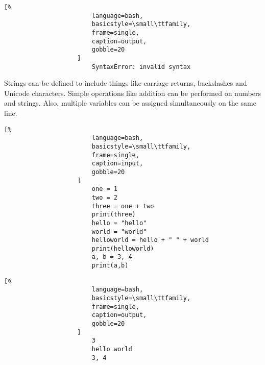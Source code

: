 \documentclass[crop=false,class=book,oneside]{standalone}
\begin{document}
                \begin{minipage}[t]{.48\textwidth}
                    \centering
                    \begin{lstlisting}[%
                        language=bash,
                        basicstyle=\small\ttfamily,
                        frame=single,
                        caption=output,
                        gobble=20
                    ]
                        SyntaxError: invalid syntax
                    \end{lstlisting}
                \end{minipage}
                Strings can be defined to include things like
                carriage returns, backslashes and Unicode characters.
                Simple operations like addition can be performed on
                numbers and strings. Also, multiple variables can be
                assigned simultaneously on the same line.\newline
                \begin{minipage}[t]{.48\textwidth}
                    \centering
                    \begin{lstlisting}[%
                        language=bash,
                        basicstyle=\small\ttfamily,
                        frame=single,
                        caption=input,
                        gobble=20
                    ]
                        one = 1
                        two = 2
                        three = one + two
                        print(three)
                        hello = "hello"
                        world = "world"
                        helloworld = hello + " " + world
                        print(helloworld)
                        a, b = 3, 4
                        print(a,b)
                    \end{lstlisting}
                \end{minipage}
                \hfill
                \begin{minipage}[t]{.48\textwidth}
                    \centering
                    \begin{lstlisting}[%
                        language=bash,
                        basicstyle=\small\ttfamily,
                        frame=single,
                        caption=output,
                        gobble=20
                    ]
                        3
                        hello world
                        3, 4
                    \end{lstlisting}
                \end{minipage}
\end{document}
